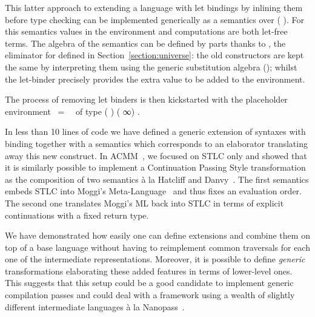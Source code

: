 This latter approach to extending a language  with let bindings
by inlining them before type checking can be implemented generically as
a semantics over (  ). For this semantics values
in the environment and computations are both let-free terms. The algebra
of the semantics can be defined by parts thanks to , the eliminator
for  defined in Section~\ref{section:universe}:
the old constructors are kept the same by
interpreting them using the generic substitution algebra ();
whilst the let-binder precisely provides the extra value to be added to the
environment.

\begin{agdasnippet}
\end{agdasnippet}

The process of removing let binders is then kickstarted with the placeholder
environment ~=~~ 
of type {( ) (  ∞) }. 

\begin{agdasnippet}
\end{agdasnippet}

In less than 10 lines of code we have defined a generic extension of
syntaxes with binding together with a semantics which corresponds
to an elaborator translating away this new construct.
In ACMM~\citeyear{allais2017type}, we focused on STLC only
and showed that it is similarly possible to implement a Continuation
Passing Style transformation as the composition of two semantics
à la Hatcliff and Danvy~\citeyear{hatcliff1994generic}.
The first semantics embeds STLC into Moggi's
Meta-Language~\citeyear{DBLP:journals/iandc/Moggi91} and thus fixes
an evaluation order. The second one translates Moggi's ML back into
STLC in terms of explicit continuations with a fixed return type.

We have demonstrated how easily one can define extensions and combine
them on top of a base language without having to reimplement common
traversals for each one of the intermediate representations. Moreover,
it is possible to define \emph{generic} transformations elaborating
these added features in terms of lower-level ones. This suggests that
this setup could be a good candidate to implement generic compilation
passes and could deal with a framework using a wealth of slightly
different intermediate languages à la Nanopass~\cite{Keep:2013:NFC:2544174.2500618}.
